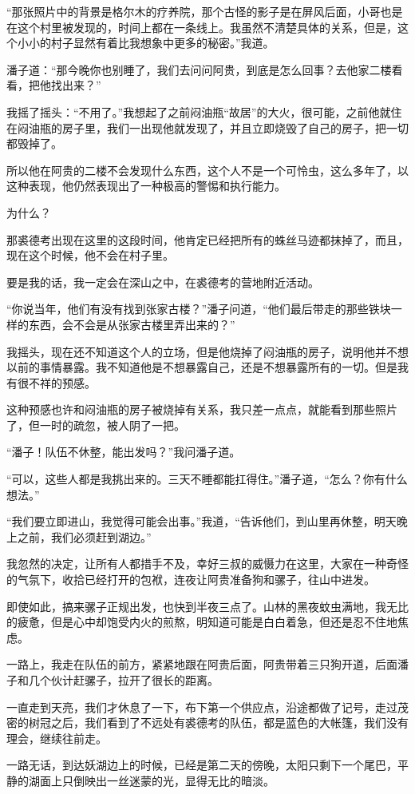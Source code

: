 “那张照片中的背景是格尔木的疗养院，那个古怪的影子是在屏风后面，小哥也是在这个村里被发现的，时间上都在一条线上。我虽然不清楚具体的关系，但是，这个小小的村子显然有着比我想象中更多的秘密。”我道。

潘子道：“那今晚你也别睡了，我们去问问阿贵，到底是怎么回事？去他家二楼看看，把他找出来？”

我摇了摇头：“不用了。”我想起了之前闷油瓶“故居”的大火，很可能，之前他就住在闷油瓶的房子里，我们一出现他就发现了，并且立即烧毁了自己的房子，把一切都毁掉了。

所以他在阿贵的二楼不会发现什么东西，这个人不是一个可怜虫，这么多年了，以这种表现，他仍然表现出了一种极高的警惕和执行能力。

为什么？

那裘德考出现在这里的这段时间，他肯定已经把所有的蛛丝马迹都抹掉了，而且，现在这个时候，他不会在村子里。

要是我的话，我一定会在深山之中，在裘德考的营地附近活动。

“你说当年，他们有没有找到张家古楼？”潘子问道，“他们最后带走的那些铁块一样的东西，会不会是从张家古楼里弄出来的？”

我摇头，现在还不知道这个人的立场，但是他烧掉了闷油瓶的房子，说明他并不想以前的事情暴露。我不知道他是不想暴露自己，还是不想暴露所有的一切。但是我有很不祥的预感。

这种预感也许和闷油瓶的房子被烧掉有关系，我只差一点点，就能看到那些照片了，但一时的疏忽，被人阴了一把。

“潘子！队伍不休整，能出发吗？”我问潘子道。

“可以，这些人都是我挑出来的。三天不睡都能扛得住。”潘子道，“怎么？你有什么想法。”

“我们要立即进山，我觉得可能会出事。”我道，“告诉他们，到山里再休整，明天晚上之前，我们必须赶到湖边。”

我忽然的决定，让所有人都措手不及，幸好三叔的威慑力在这里，大家在一种奇怪的气氛下，收拾已经打开的包袱，连夜让阿贵准备狗和骡子，往山中进发。

即使如此，搞来骡子正规出发，也快到半夜三点了。山林的黑夜蚊虫满地，我无比的疲惫，但是心中却饱受内火的煎熬，明知道可能是白白着急，但还是忍不住地焦虑。

一路上，我走在队伍的前方，紧紧地跟在阿贵后面，阿贵带着三只狗开道，后面潘子和几个伙计赶骡子，拉开了很长的距离。

一直走到天亮，我们才休息了一下，布下第一个供应点，沿途都做了记号，走过茂密的树冠之后，我们看到了不远处有裘德考的队伍，都是蓝色的大帐篷，我们没有理会，继续往前走。

一路无话，到达妖湖边上的时候，已经是第二天的傍晚，太阳只剩下一个尾巴，平静的湖面上只倒映出一丝迷蒙的光，显得无比的暗淡。

